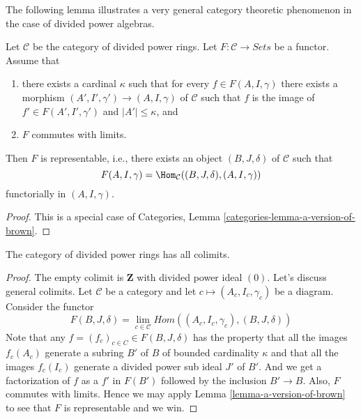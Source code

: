 \noindent
The following lemma illustrates a very general category theoretic
phenomenon in the case of divided power algebras.

\begin{lemma}
\label{lemma-a-version-of-brown}
Let $\mathcal{C}$ be the category of divided power rings. Let
$F : \mathcal{C} \to \textit{Sets}$ be a functor.
Assume that
\begin{enumerate}
\item there exists a cardinal $\kappa$ such that for every
$f \in F(A, I, \gamma)$ there exists a morphism
$(A', I', \gamma') \to (A, I, \gamma)$ of $\mathcal{C}$ such that $f$
is the image of $f' \in F(A', I', \gamma')$ and $|A'| \leq \kappa$, and
\item $F$ commutes with limits.
\end{enumerate}
Then $F$ is representable, i.e., there exists an object $(B, J, \delta)$
of $\mathcal{C}$ such that
$$
F(A, I, \gamma) = \Hom_\mathcal{C}((B, J, \delta), (A, I, \gamma))
$$
functorially in $(A, I, \gamma)$.
\end{lemma}

\begin{proof}
This is a special case of
Categories, Lemma \ref{categories-lemma-a-version-of-brown}.
\end{proof}

\begin{lemma}
\label{lemma-colimits}
The category of divided power rings has all colimits.
\end{lemma}

\begin{proof}
The empty colimit is $\mathbf{Z}$ with divided power ideal $(0)$.
Let's discuss general colimits. Let $\mathcal{C}$ be a category and let
$c \mapsto (A_c, I_c, \gamma_c)$ be a diagram. Consider the functor
$$
F(B, J, \delta) = \lim_{c \in \mathcal{C}}
Hom((A_c, I_c, \gamma_c), (B, J, \delta))
$$
Note that any $f = (f_c)_{c \in C} \in F(B, J, \delta)$ has the property
that all the images $f_c(A_c)$ generate a subring $B'$ of $B$ of bounded
cardinality $\kappa$ and that all the images $f_c(I_c)$ generate a
divided power sub ideal $J'$ of $B'$. And we get a factorization of
$f$ as a $f'$ in $F(B')$ followed by the inclusion $B' \to B$. Also,
$F$ commutes with limits. Hence we may apply
Lemma \ref{lemma-a-version-of-brown}
to see that $F$ is representable and we win.
\end{proof}


